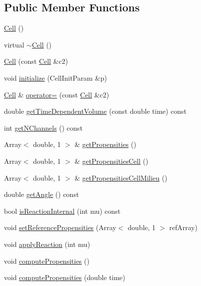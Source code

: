 \subsection*{\-Public \-Member \-Functions}
\begin{DoxyCompactItemize}
\item 
\hyperlink{class_cell_a394510643e8664cf12b5efaf5cb99f71}{\-Cell} ()
\item 
virtual \hyperlink{class_cell_a9fa559f7a28e2b4336c6879ca09304d8}{$\sim$\-Cell} ()
\item 
\hyperlink{class_cell_aa0fda2bd78b5e4620e237cb7415bb62a}{\-Cell} (const \hyperlink{class_cell}{\-Cell} \&c2)
\item 
void \hyperlink{class_cell_a1762ba87b6cd232fb4d5ca9513600214}{initialize} (\-Cell\-Init\-Param \&p)
\item 
\hyperlink{class_cell}{\-Cell} \& \hyperlink{class_cell_a30910c960819ab01b80c4268a22b1579}{operator=} (const \hyperlink{class_cell}{\-Cell} \&c2)
\item 
double \hyperlink{class_cell_a4f4950f9901d2e52218da8421d11a78f}{get\-Time\-Dependent\-Volume} (const double time) const 
\item 
int \hyperlink{class_cell_a98b05ad9c5ba1a0bb719df105eb1b56f}{get\-N\-Channels} () const 
\item 
\-Array$<$ double, 1 $>$ \& \hyperlink{class_cell_abed1503a45db1ec72fe2f9721bb8dd7d}{get\-Propensities} ()
\item 
\-Array$<$ double, 1 $>$ \& \hyperlink{class_cell_a001e74a518b87008ab0235095b802677}{get\-Propensities\-Cell} ()
\item 
\-Array$<$ double, 1 $>$ \& \hyperlink{class_cell_aa277030af60d6cf9b0698e49a907996e}{get\-Propensities\-Cell\-Milieu} ()
\item 
double \hyperlink{class_cell_aaf492522ce24129fcac85bafb5dcc8f2}{get\-Angle} () const 
\item 
bool \hyperlink{class_cell_a15cfab0157a0180d1f409ed8afc5c14b}{is\-Reaction\-Internal} (int mu) const 
\item 
void \hyperlink{class_cell_a1eb2a609160163f5768e5708cd55a8e2}{set\-Reference\-Propensities} (\-Array$<$ double, 1 $>$ ref\-Array)
\item 
void \hyperlink{class_cell_a0559f4ae5b505afcd98a04ab259bc489}{apply\-Reaction} (int mu)
\item 
void \hyperlink{class_cell_ad872f4f01c39feb953ee27a9d37963af}{compute\-Propensities} ()
\item 
void \hyperlink{class_cell_a91e4b4765817d5287c69d21ff70906c9}{compute\-Propensities} (double time)

\end{DoxyCompactItemize}

